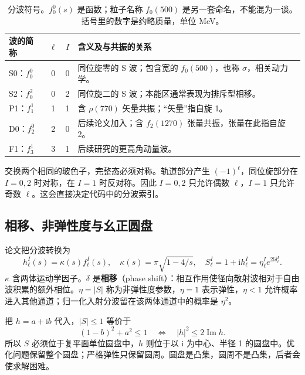 \documentclass[UTF8,a4paper,11pt,fontset=fandol]{ctexart}
\numberwithin{equation}{section}
\newcommand{\ii}{\mathrm i}
\newcommand{\Imm}{\operatorname{Im}}
\begin{document}
\begin{table}[H]\centering
\begin{tabularx}{\linewidth}{lccY}
\toprule
波的简称 & \(\ell\) & \(I\) & 含义及与共振的关系\\
\midrule
S0：\(f_0^0\) & 0 & 0 & 同位旋零的 S 波；包含宽的 \(f_0(500)\)，也称 \(\sigma\)，相关动力学。\\
S2：\(f_0^2\) & 0 & 2 & 同位旋二的 S 波；本能区通常表现为排斥型相移。\\
P1：\(f_1^1\) & 1 & 1 & 含 \(\rho(770)\) 矢量共振；“矢量”指自旋 1。\\
D0：\(f_2^0\) & 2 & 0 & 后续论文加入；含 \(f_2(1270)\) 张量共振，张量在此指自旋 2。\\
F1：\(f_3^1\) & 3 & 1 & 后续研究的更高角动量波。\\
\bottomrule
\end{tabularx}
\caption{分波符号。\(f_0^0(s)\) 是函数；粒子名称 \(f_0(500)\) 是另一套命名，不能混为一谈。括号里的数字是约略质量，单位 MeV。}
\end{table}

交换两个相同的玻色子，完整态必须对称。轨道部分产生 \((-1)^\ell\)，同位旋部分在 \(I=0,2\) 时对称，在 \(I=1\) 时反对称。因此 \(I=0,2\) 只允许偶数 \(\ell\)，\(I=1\) 只允许奇数 \(\ell\)。这会直接决定代码中的分波索引。

\subsection{相移、非弹性度与幺正圆盘}
论文把分波转换为
\begin{equation}\label{eq:Shf}
h_\ell^I(s)=\kappa(s)f_\ell^I(s),\quad
\kappa(s)=\pi\sqrt{1-4/s},\quad
S_\ell^I=1+\ii h_\ell^I=\eta_\ell^I e^{2\ii\delta_\ell^I}.
\end{equation}
\(\kappa\) 含两体运动学因子。\(\delta\) 是\textbf{相移}（phase shift）：相互作用使径向散射波相对于自由波积累的额外相位。\(\eta=|S|\) 称为非弹性度参数，\(\eta=1\) 表示弹性，\(\eta<1\) 允许概率进入其他通道；归一化入射分波留在该两体通道中的概率是 \(\eta^2\)。

把 \(h=a+\ii b\) 代入，\(|S|\le1\) 等价于
\begin{equation}\label{eq:disk}
(1-b)^2+a^2\le1
\quad\Longleftrightarrow\quad |h|^2\le2\Imm h.
\end{equation}
所以 \(S\) 必须位于复平面单位圆盘中，\(h\) 则位于以 \(\ii\) 为中心、半径 1 的圆盘中。优化问题保留整个圆盘；严格弹性只保留圆周。圆盘是凸集，圆周不是凸集，后者会使求解困难。
\end{document}
